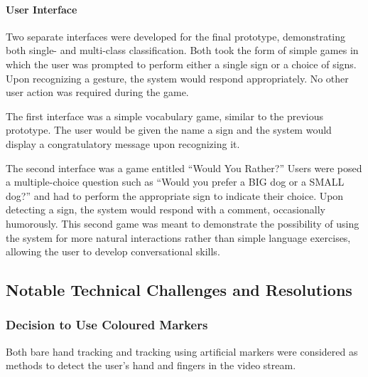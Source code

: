 \documentclass[12pt]{article}
\begin{document}
\paragraph{User Interface}
Two separate interfaces were developed for the final prototype, demonstrating both single- and multi-class classification. Both took the form of simple games in which the user was prompted to perform either a single sign or a choice of signs. Upon recognizing a gesture, the system would respond appropriately. No other user action was required during the game.

The first interface was a simple vocabulary game, similar to the previous prototype. The user would be given the name a sign and the system would display a congratulatory message upon recognizing it. 

The second interface was a game entitled “Would You Rather?”  Users were posed a multiple-choice question such as “Would you prefer a BIG dog or a SMALL dog?” and had to perform the appropriate sign to indicate their choice. Upon detecting a sign, the system would respond with a comment, occasionally humorously. This second game was meant to demonstrate the possibility of using the system for more natural interactions rather than simple language exercises, allowing the user to develop conversational skills.

\subsection{Notable Technical Challenges and Resolutions}
\subsubsection{Decision to Use Coloured Markers}
Both bare hand tracking and tracking using artificial markers were considered as methods to detect the user’s hand and fingers in the video stream.
\end{document}
